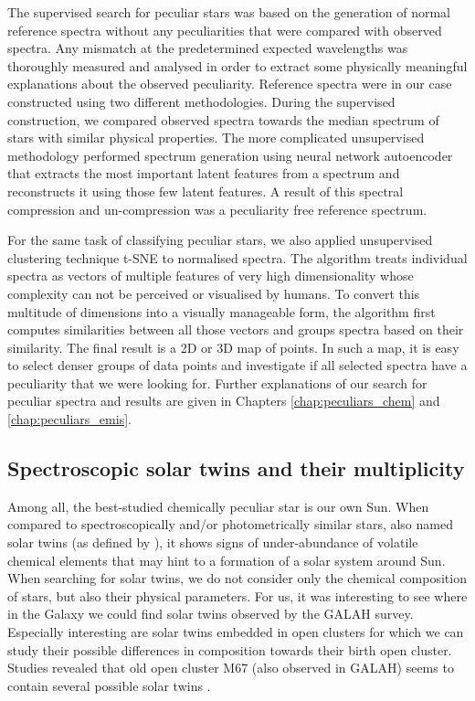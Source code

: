 The supervised search for peculiar stars was based on the generation of normal reference spectra without any peculiarities that were compared with observed spectra. Any mismatch at the predetermined expected wavelengths was thoroughly measured and analysed in order to extract some physically meaningful explanations about the observed peculiarity. Reference spectra were in our case constructed using two different methodologies. During the supervised construction, we compared observed spectra towards the median spectrum of stars with similar physical properties. The more complicated unsupervised methodology performed spectrum generation using neural network autoencoder that extracts the most important latent features from a spectrum and reconstructs it using those few latent features. A result of this spectral compression and un-compression was a peculiarity free reference spectrum.

For the same task of classifying peculiar stars, we also applied unsupervised clustering technique t-SNE \cite{2013arXiv1301.3342V} to normalised spectra. The algorithm treats individual spectra as vectors of multiple features of very high dimensionality whose complexity can not be perceived or visualised by humans. To convert this multitude of dimensions into a visually manageable form, the algorithm first computes similarities between all those vectors and groups spectra based on their similarity. The final result is a 2D or 3D map of points. In such a map, it is easy to select denser groups of data points and investigate if all selected spectra have a peculiarity that we were looking for. Further explanations of our search for peculiar spectra and results are given in Chapters \ref{chap:peculiars_chem} and \ref{chap:peculiars_emis}.

\subsection{Spectroscopic solar twins and their multiplicity}
Among all, the best-studied chemically peculiar star is our own Sun. When compared to spectroscopically and/or photometrically similar stars, also named solar twins (as defined by \citet{2017AN....338..442A}), it shows signs of under-abundance of volatile chemical elements \cite{2009ApJ...704L..66M} that may hint to a formation of a solar system around Sun. When searching for solar twins, we do not consider only the chemical composition of stars, but also their physical parameters. For us, it was interesting to see where in the Galaxy we could find solar twins observed by the GALAH survey. Especially interesting are solar twins embedded in open clusters for which we can study their possible differences in composition towards their birth open cluster. Studies revealed that old open cluster M67 (also observed in GALAH) seems to contain several possible solar twins \cite{2009MmSAI..80..125B, 2016MNRAS.463..696L}.

